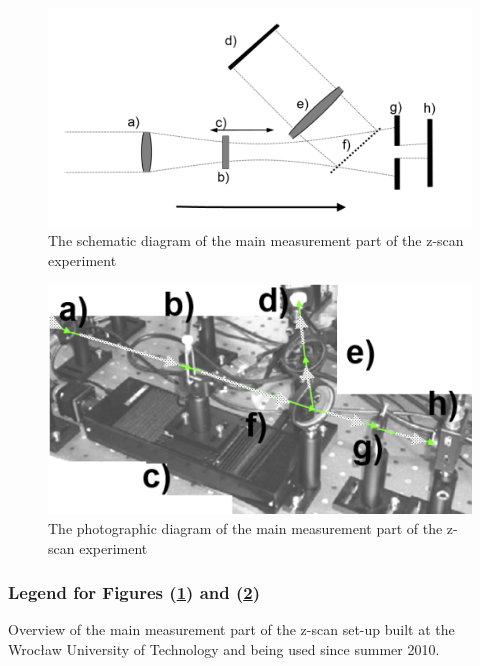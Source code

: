 \documentclass[12pt,twoside,a4paper]{article}
\numberwithin{equation}{subsection}
\numberwithin{figure}{subsection}
\begin{document}
\begin{figure}
 \includegraphics{img/zscan_sch.png}
 \caption{ The schematic diagram of the main measurement part of the z-scan experiment 
 \label{fig:zscan_sch}}
\end{figure}

\begin{figure}
 \includegraphics{img/zscan_diag.png}
 \caption{The photographic diagram of the main measurement part of the z-scan experiment 
 \label{fig:zscan_diag}}
\end{figure}

\subsubsection*{Legend for Figures (\ref{fig:zscan_sch}) and (\ref{fig:zscan_diag})} 
Overview of the main measurement part of the z-scan set-up built at the Wrocław University of Technology and being used since summer 2010.
 
\end{document}
